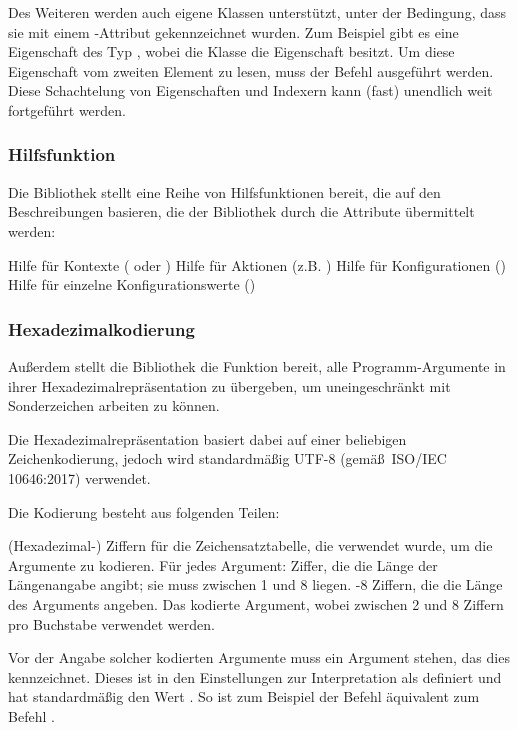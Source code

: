 Des Weiteren werden auch eigene Klassen unterstützt, unter der Bedingung, dass sie mit einem -Attribut gekennzeichnet wurden.
Zum Beispiel gibt es eine Eigenschaft des Typ , wobei die Klasse  die Eigenschaft  besitzt.
Um diese Eigenschaft vom zweiten Element zu lesen, muss der Befehl  ausgeführt werden.
Diese Schachtelung von Eigenschaften und Indexern kann (fast) unendlich weit fortgeführt werden.
\subsubsection{Hilfsfunktion}
Die Bibliothek stellt eine Reihe von Hilfsfunktionen bereit, die auf den Beschreibungen basieren, die der Bibliothek durch die Attribute übermittelt werden:
\begin{outline}
 \1 Hilfe für Kontexte ( oder )
 \1 Hilfe für Aktionen (z.B. )
 \1 Hilfe für Konfigurationen ()
 \1 Hilfe für einzelne Konfigurationswerte ()
\end{outline}
\subsubsection{Hexadezimalkodierung}\label{Hexadecimalencoding}
Außerdem stellt die Bibliothek die Funktion bereit, alle Programm-Argumente in ihrer Hexadezimalrepräsentation zu übergeben, um uneingeschränkt mit Sonderzeichen arbeiten zu können.

Die Hexadezimalrepräsentation basiert dabei auf einer beliebigen Zeichenkodierung, jedoch wird standardmäßig UTF-8 (gemäß~ISO/IEC 10646:2017) verwendet.

Die Kodierung besteht aus folgenden Teilen:
\begin{outline}
  (Hexadezimal-) Ziffern für die Zeichensatztabelle, die verwendet wurde, um die Argumente zu kodieren.
 \1 Für jedes Argument:
   Ziffer, die die Länge der Längenangabe angibt;
  sie muss zwischen 1 und 8 liegen. 
  -8 Ziffern, die die Länge des Arguments angeben.
  \2 Das kodierte Argument, wobei zwischen 2 und 8 Ziffern pro Buchstabe verwendet werden.
\end{outline}

Vor der Angabe solcher kodierten Argumente muss ein Argument stehen, das dies kennzeichnet.
Dieses ist in den Einstellungen zur Interpretation als  definiert und hat standardmäßig den Wert .
So ist zum Beispiel der Befehl  äquivalent zum Befehl .

